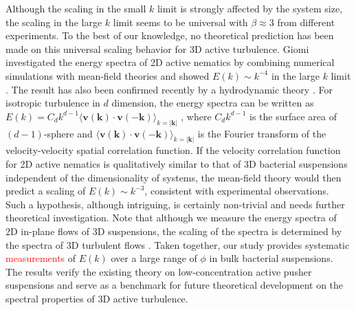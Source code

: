 \documentclass[twocolumn,aps,prx,amsmath,amssymb,longbibliography,superscriptaddress]{revtex4-2}
\begin{document}
Although the scaling in the small $k$ limit is strongly affected by the system size, the scaling in the large $k$ limit seems to be universal with $\beta \approx 3$ from different experiments. To the best of our knowledge, no theoretical prediction has been made on this universal scaling behavior for 3D active turbulence. Giomi investigated the energy spectra of 2D active nematics by combining numerical simulations with mean-field theories and showed $E(k) \sim k^{-4}$ in the large $k$ limit \cite{Giomi2015}.
The result has also been confirmed recently by a hydrodynamic theory \cite{Alert2020}. For isotropic turbulence in $d$ dimension, the energy spectra can be written as $E(k) = C_d k^{d-1} \langle \mathbf{v}(\mathbf{k})\cdot \mathbf{v}(-\mathbf{k})\rangle_{k = |\mathbf{k}|}$ \cite{Wensink2012,Bardfalvy2019},
where $C_d k^{d-1}$ is the surface area of $(d-1)$-sphere and $\langle \mathbf{v}(\mathbf{k})\cdot \mathbf{v}(-\mathbf{k})\rangle_{k = |\mathbf{k}|}$ is the Fourier transform of the velocity-velocity spatial correlation function. If the velocity correlation function for 2D active nematics is qualitatively similar to that of 3D bacterial suspensions independent of the dimensionality of systems, the mean-field theory would then predict a scaling of $E(k) \sim k^{-3}$, consistent with experimental observations. Such a hypothesis, although intriguing, is certainly non-trivial and needs further theoretical investigation. Note that although we measure the energy spectra of 2D in-plane flows of 3D suspensions, the scaling of the spectra is determined by the spectra of 3D turbulent flows \cite{Pope2000}. Taken together, our study provides systematic \textcolor{red}{measurements}
of $E(k)$ over a large range of $\phi$ in bulk bacterial suspensions. The results verify the existing theory on low-concentration active pusher suspensions and serve as a benchmark for future theoretical development on the spectral properties of 3D active turbulence.
\end{document}
